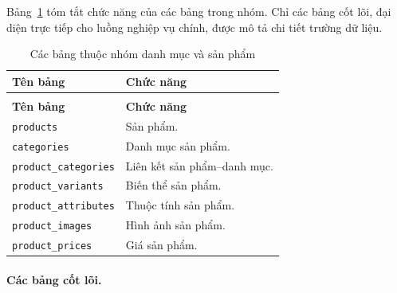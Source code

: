 Bảng~\ref{tab:data-summary-catalog-product} tóm tắt chức năng của các bảng trong nhóm. Chỉ các bảng cốt lõi, đại diện trực tiếp cho luồng nghiệp vụ chính, được mô tả chi tiết trường dữ liệu.

\begin{longtable}{|>{\RaggedRight\arraybackslash}p{}|>{\RaggedRight\arraybackslash}p{}|}
    \caption{Các bảng thuộc nhóm danh mục và sản phẩm}
    \label{tab:data-summary-catalog-product} \\
    \hline
    \textbf{Tên bảng} & \textbf{Chức năng} \\
    \hline
    \endfirsthead
    \multicolumn{2}{c}{\tablename\ \thetable\ (tiếp theo)} \\
    \hline
    \textbf{Tên bảng} & \textbf{Chức năng} \\
    \hline
    \endhead
    \texttt{products} & Sản phẩm. \\
    \hline
    \texttt{categories} & Danh mục sản phẩm. \\
    \hline
    \texttt{product\_categories} & Liên kết sản phẩm--danh mục. \\
    \hline
    \texttt{product\_variants} & Biến thể sản phẩm. \\
    \hline
    \texttt{product\_attributes} & Thuộc tính sản phẩm. \\
    \hline
    \texttt{product\_images} & Hình ảnh sản phẩm. \\
    \hline
    \texttt{product\_prices} & Giá sản phẩm. \\
    \hline
\end{longtable}

\paragraph{Các bảng cốt lõi.}

